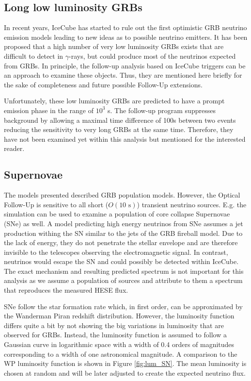 

\subsection{Long low luminosity GRBs}
In recent years, IceCube has started to rule out the first optimistic GRB
neutrino emission models leading to new ideas as to possible neutrino emitters.
It has been proposed \cite{lowlumgrbs} that a high number of very low
luminosity GRBs exists that are difficult to detect in $\gamma$-rays, but could
produce most of the neutrinos expected from GRBs. In principle, the follow-up
analysis based on IceCube triggers can be an approach to examine these objects.
Thus, they are mentioned here briefly for the sake of completeness and future 
possible Follow-Up extensions. 

Unfortunately, these low luminosity GRBs are predicted to have a prompt
emission phase in the range of $10^3$ s. The follow-up program suppresses
background by allowing a maximal time difference of 100s between two events
reducing the sensitivity to very long GRBs at the same time. Therefore, they
have not been examined yet within this analysis but mentioned for the 
interested reader.

\subsection{Supernovae}
The models presented described GRB population models. However, the Optical 
Follow-Up is sensitive to all short ($O(10 \text{ s})$) transient neutrino 
sources. E.g. the simulation can be used to examine a population of core 
collapse Supernovae (SNe) as well. A model predicting high energy neutrinos 
from SNe \cite{AB} assumes a jet production withing the SN similar to the jets 
of 
the GRB fireball model. Due to the lack of energy, they do not penetrate the 
stellar envelope and are therefore invisible to the telescopes 
observing the electromagnetic signal. In contrast, neutrinos would escape the 
SN and could possibly be detected within IceCube. The exact mechanism and 
resulting predicted spectrum is not important for this analysis as we assume a 
population of sources and attribute to them a spectrum that reproduces the 
measured HESE flux.

SNe follow the star formation rate which, in first order, can be approximated 
by the Wanderman Piran redshift distribution. However, the luminosity function 
differs quite a bit by not showing the big variations in luminosity that are 
observed for GRBs. Instead, the luminosity function is assumed to follow a 
Gaussian curve in logarithmic space with a width of 0.4 orders of magnitudes 
corresponding to a width of one astronomical magnitude. A comparison to the WP 
luminosity function is shown in Figure \ref{fig:lum_SN}. The mean luminosity is 
chosen at random and will be later adjusted to create the expected neutrino 
flux.


